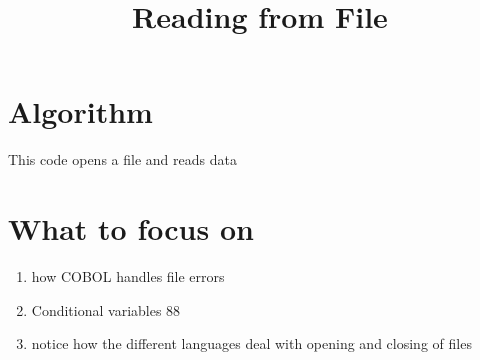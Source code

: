 \documentclass[letterpaper,12pt]{article}
\begin{document}
\title{Reading from File} 
\maketitle

\section{Algorithm}
This code opens a file and reads data

\section{What to focus on}
\begin{enumerate}
    \item how COBOL handles file errors
    \item Conditional variables 88
    \item notice how the different languages deal with opening and closing of files
\end{enumerate}
\end{document}
